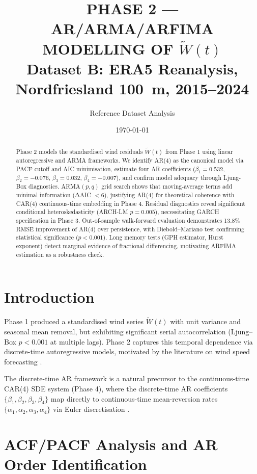 \documentclass[11pt]{article}
\title{\textbf{PHASE 2 — AR/ARMA/ARFIMA MODELLING OF $\widetilde{W}(t)$}\\
Dataset B: ERA5 Reanalysis, Nordfriesland 100~m, 2015--2024}
\author{Reference Dataset Analysis}
\date{\today}
\begin{document}
\maketitle

\begin{abstract}
\noindent
Phase 2 models the standardised wind residuals $\widetilde{W}(t)$ from Phase 1 using linear autoregressive and ARMA frameworks. We identify AR(4) as the canonical model via PACF cutoff and AIC minimisation, estimate four AR coefficients ($\beta_1 = 0.532$, $\beta_2 = -0.076$, $\beta_3 = 0.032$, $\beta_4 = -0.007$), and confirm model adequacy through Ljung-Box diagnostics. ARMA$(p,q)$ grid search shows that moving-average terms add minimal information (ΔAIC $< 6$), justifying AR(4) for theoretical coherence with CAR(4) continuous-time embedding in Phase 4. Residual diagnostics reveal significant conditional heteroskedasticity (ARCH-LM $p = 0.005$), necessitating GARCH specification in Phase 3. Out-of-sample walk-forward evaluation demonstrates 13.8\% RMSE improvement of AR(4) over persistence, with Diebold--Mariano test confirming statistical significance ($p < 0.001$). Long memory tests (GPH estimator, Hurst exponent) detect marginal evidence of fractional differencing, motivating ARFIMA estimation as a robustness check.
\end{abstract}

\section{Introduction}

Phase 1 produced a standardised wind series $\widetilde{W}(t)$ with unit variance and seasonal mean removal, but exhibiting significant serial autocorrelation (Ljung--Box $p < 0.001$ at multiple lags). Phase 2 captures this temporal dependence via discrete-time autoregressive models, motivated by the literature on wind speed forecasting \citep{SaltyteBenth2009, Alexandrinis2013, Torres2005}.

The discrete-time AR framework is a natural precursor to the continuous-time CAR(4) SDE system (Phase 4), where the discrete-time AR coefficients $\{\beta_1, \beta_2, \beta_3, \beta_4\}$ map directly to continuous-time mean-reversion rates $\{\alpha_1, \alpha_2, \alpha_3, \alpha_4\}$ via Euler discretisation \citep{BenthSaltyteBenth2009}.

\section{ACF/PACF Analysis and AR Order Identification}
\end{document}
